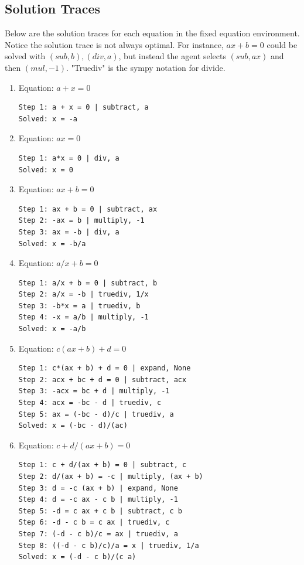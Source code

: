 \documentclass{article}
\theoremstyle{plain}
\theoremstyle{definition}
\theoremstyle{remark}
\begin{document}
\subsection{Solution Traces}
Below are the solution traces for each equation in the fixed equation environment. Notice the solution trace is not always optimal. For instance, $ax+b=0$ could be solved with $(sub,b),(div,a)$, but instead the agent selects $(sub,ax)$ and then $(mul,-1)$. "Truediv" is the sympy notation for divide.

\begin{enumerate}
\item Equation: $a + x = 0$
\begin{verbatim}
Step 1: a + x = 0 | subtract, a
Solved: x = -a
\end{verbatim}
\item Equation: $a x = 0$
\begin{verbatim}
Step 1: a*x = 0 | div, a
Solved: x = 0
\end{verbatim}
\item Equation: $a x + b = 0$
\begin{verbatim}
Step 1: ax + b = 0 | subtract, ax
Step 2: -ax = b | multiply, -1
Step 3: ax = -b | div, a
Solved: x = -b/a
\end{verbatim}
\item Equation: $a/x + b = 0$
\begin{verbatim}
Step 1: a/x + b = 0 | subtract, b
Step 2: a/x = -b | truediv, 1/x
Step 3: -b*x = a | truediv, b
Step 4: -x = a/b | multiply, -1
Solved: x = -a/b
\end{verbatim}
\item Equation: $c(a x + b) + d = 0$
\begin{verbatim}
Step 1: c*(ax + b) + d = 0 | expand, None
Step 2: acx + bc + d = 0 | subtract, acx
Step 3: -acx = bc + d | multiply, -1
Step 4: acx = -bc - d | truediv, c
Step 5: ax = (-bc - d)/c | truediv, a
Solved: x = (-bc - d)/(ac)
\end{verbatim}
\item Equation: $c + d/(a x + b) = 0$
\begin{verbatim}
Step 1: c + d/(ax + b) = 0 | subtract, c
Step 2: d/(ax + b) = -c | multiply, (ax + b)
Step 3: d = -c (ax + b) | expand, None
Step 4: d = -c ax - c b | multiply, -1
Step 5: -d = c ax + c b | subtract, c b
Step 6: -d - c b = c ax | truediv, c
Step 7: (-d - c b)/c = ax | truediv, a
Step 8: ((-d - c b)/c)/a = x | truediv, 1/a
Solved: x = (-d - c b)/(c a)
\end{verbatim}

\end{enumerate}
\end{document}

